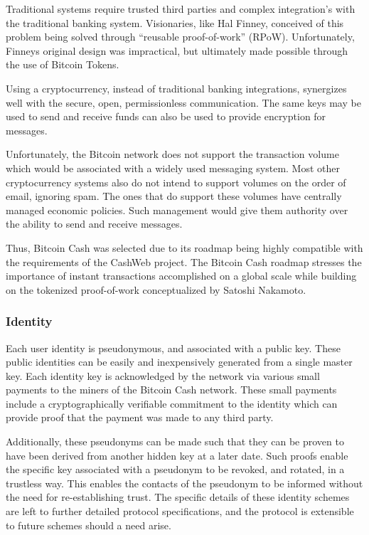 \documentclass{article}
\begin{document}
Traditional systems require trusted third parties and complex integration's with the traditional banking system. Visionaries, like Hal Finney, conceived of this problem being solved through ``reusable proof-of-work'' (RPoW). Unfortunately, Finneys original design was impractical, but ultimately made possible through the use of Bitcoin Tokens.

Using a cryptocurrency, instead of traditional banking integrations, synergizes well with the secure, open, permissionless communication. The same keys may be used to send and receive funds can also be used to provide encryption for messages.

Unfortunately, the Bitcoin network does not support the transaction volume which would be associated with a widely used messaging system. Most other cryptocurrency systems also do not intend to support volumes on the order of email, ignoring spam. The ones that do support these volumes have centrally managed economic policies. Such management would give them authority over the ability to send and receive messages.

Thus, Bitcoin Cash was selected due to its roadmap being highly compatible with the requirements of the CashWeb project. The Bitcoin Cash roadmap stresses the importance of instant transactions accomplished on a global scale while building on the tokenized proof-of-work conceptualized by Satoshi Nakamoto.

\subsubsection{Identity}

Each user identity is pseudonymous, and associated with a public key. These public identities can be easily and inexpensively generated from a single master key. Each identity key is acknowledged by the network via various small payments to the miners of the Bitcoin Cash network. These small payments include a cryptographically verifiable commitment to the identity which can provide proof that the payment was made to any third party.

Additionally, these pseudonyms can be made such that they can be proven to have been derived from another hidden key at a later date. Such proofs enable the specific key associated with a pseudonym to be revoked, and rotated, in a trustless way. This enables the contacts of the pseudonym to be informed without the need for re-establishing trust. The specific details of these identity schemes are left to further detailed protocol specifications, and the protocol is extensible to future schemes should a need arise.
\end{document}
